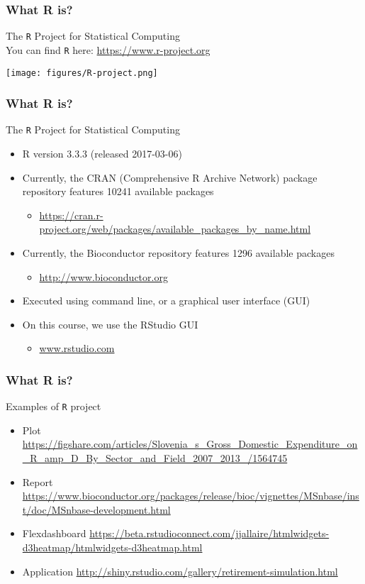 \documentclass{beamer}
\begin{document}
\begin{frame}
	\frametitle{What R is?}
        \Large The \texttt{R} Project for Statistical Computing\\
	\small You can find \texttt{R} here:
	\url{https://www.r-project.org}\\
	\begin{center} \texttt{[image: figures/R-project.png]} \end{center}
\end{frame}

\begin{frame}
	\frametitle{What R is?}
        \Large The \texttt{R} Project for Statistical Computing\\
	\begin{itemize}
		\small
		\item R version 3.3.3 (released 2017-03-06)
		\item Currently, the CRAN {\tiny(Comprehensive R Archive Network)} package repository features 10241 available packages
			\begin{itemize}
				\item \tiny \url{https://cran.r-project.org/web/packages/available_packages_by_name.html}
			\end{itemize}
		\item Currently, the Bioconductor repository features 1296 available packages
			\begin{itemize}
				\item \tiny \url{http://www.bioconductor.org}
			\end{itemize}
		\item Executed using command line, or a graphical user interface (GUI)
		\item On this course, we use the RStudio GUI
			\begin{itemize}
				\item \tiny \url{www.rstudio.com}
			\end{itemize}
	\end{itemize}
\end{frame}

\begin{frame}
	\frametitle{What R is?}
        \Large Examples of \texttt{R} project\\
	\begin{itemize}
		\normalsize
	\item Plot \tiny \url{https://figshare.com/articles/Slovenia_s_Gross_Domestic_Expenditure_on_R_amp_D_By_Sector_and_Field_2007_2013_/1564745}
		\normalsize
		\item Report \tiny \url{https://www.bioconductor.org/packages/release/bioc/vignettes/MSnbase/inst/doc/MSnbase-development.html}
		\normalsize
		\item Flexdashboard \tiny \url{https://beta.rstudioconnect.com/jjallaire/htmlwidgets-d3heatmap/htmlwidgets-d3heatmap.html}
		\normalsize
		\item Application \tiny \url{http://shiny.rstudio.com/gallery/retirement-simulation.html}
		\normalsize
	\end{itemize}
\end{frame}
\end{document}
